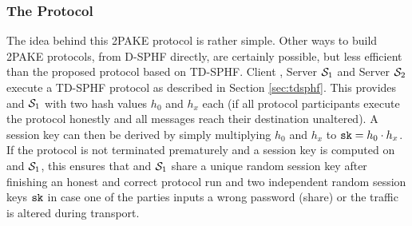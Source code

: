 \subsubsection{The Protocol}\label{sec:2pakeprotocol}
The idea behind this \ac{2PAKE} protocol is rather simple.
Other ways to build \ac{2PAKE} protocols, \eg from \ac{D-SPHF} directly, are certainly possible, but less efficient than the proposed protocol based on \ac{TD-SPHF}.
Client \Client, Server $\mathcal{S}_1$ and Server $\mathcal{S}_2$ execute a \ac{TD-SPHF} protocol as described in Section \ref{sec:tdsphf}.
This provides \Client and $\mathcal{S}_1$ with two hash values $h_0$ and $h_x$ each (if all protocol participants execute the protocol honestly and all messages reach their destination unaltered).
A session key can then be derived by simply multiplying $h_0$ and $h_x$ to $\mathtt{sk}=h_0\cdot h_x$.
If the protocol is not terminated prematurely and a session key is computed on \Client and $\mathcal{S}_1$, this ensures that \Client and $\mathcal{S}_1$ share a unique random session key after finishing an honest and correct protocol run and two independent random session keys $\mathtt{sk}$ in case one of the parties inputs a wrong password (share) or the traffic is altered during transport.


